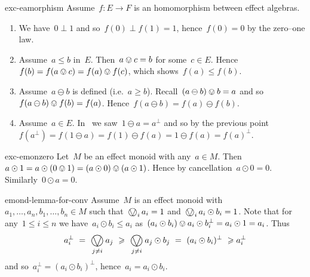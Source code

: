 \begin{solution}{exc-eamorphism}%
   Assume~$f\colon E \to F$ is an homomorphism between effect algebras.
    \begin{enumerate}
        \item
            We have~$0\perp 1$ and so~$f(0) \perp f(1) = 1$,
                hence~$f(0) = 0$ by the zero--one law.
        \item
            Assume~$a \leq b$ in~$E$.
            Then~$a \ovee c = b$ for some~$c \in E$.
            Hence~$f(b) = f(a \ovee c) = f(a) \ovee f(c)$,
            which shows~$f(a) \leq f(b)$.
        \item
            Assume~$a \ominus b$ is defined (i.e.~$a \geq b$).
            Recall~$(a \ominus b) \ovee b = a$
                and so~$f(a \ominus b) \ovee f(b) = f(a)$.
                Hence~$f(a \ominus b) = f(a) \ominus f(b)$.
        \item
            Assume~$a \in E$.
            In~ we saw~$1 \ominus a = a^\perp$
            and so by the previous point~$f(a^\perp) = f(1\ominus a) =
                f(1) \ominus f(a) = 1 \ominus f(a) = f(a)^\perp$.
    \end{enumerate}
\end{solution}
\spacingfix{}
\begin{solution}{exc-emonzero}%
    Let~$M$ be an effect monoid with any~$a \in M$.
    Then~$a\odot 1 = a \odot (0 \ovee 1) = (a\odot 0) \ovee (a \odot 1)$.
    Hence by cancellation~$a \odot 0 = 0$.
    Similarly~$0 \odot a = 0$.
\end{solution}
\begin{solution}{emond-lemma-for-conv}%
   Assume~$M$ is an effect monoid with~$a_1,\ldots,a_n,b_1, \ldots, b_n \in M$
        such that~$\bigovee_i a_i = 1$ and~$\bigovee_i a_i \odot b_i = 1$.
Note that for any~$1 \leq i \leq n$
    we have~$a_i \odot b_i \leq a_i$
        as~$(a_i \odot b_i) \ovee a_i \odot b_i^\perp = a_i \odot 1 = a_i$.
Thus
\begin{equation*}
    a_i^\perp
    \ = \ \bigovee_{j \neq i} a_j
    \ \geq \ \bigovee_{j \neq i} a_j \odot b_j
    \ = \ (a_i \odot b_i)^\perp
    \ \geq a_i^\perp
\end{equation*}
    and so~$a_i^\perp = (a_i \odot b_i)^\perp$,
        hence~$a_i = a_i \odot b_i$.
\end{solution}
